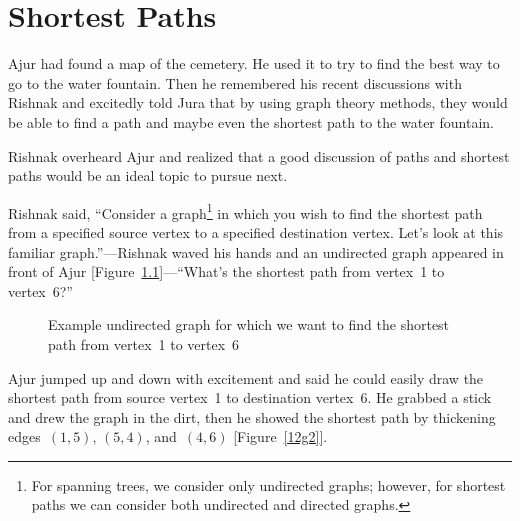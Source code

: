 \chapter{Shortest Paths}
Ajur had found a map of the cemetery. He used it to try to find the best way to go to the water fountain. Then he remembered his recent discussions with Rishnak and excitedly told Jura that by using graph theory methods, they would be able to find a path and maybe even the shortest path to the water fountain.

Rishnak overheard Ajur and realized that a good discussion of paths and shortest paths would be an ideal topic to pursue next.

Rishnak said, ``Consider a graph\footnote{For spanning trees, we consider only undirected graphs; however, for shortest paths we can consider both undirected and directed graphs.} in which you wish to find the shortest path from a specified source vertex to a specified destination vertex. Let's look at this familiar graph.''---Rishnak waved his hands and an undirected graph appeared in front of Ajur [Figure~\ref{12g1}]---``What's the shortest path from vertex~1 to vertex~6?''

\begin{figure}
\begin{center}
\caption{Example undirected graph for which we want to find the shortest path from vertex~1 to vertex~6}\label{12g1}
\end{center}
\end{figure}

Ajur jumped up and down with excitement and said he could easily draw the shortest path from source vertex~1 to destination vertex~6. He grabbed a stick and drew the graph in the dirt, then he showed the shortest path by thickening edges~$(1,5)$, $(5,4)$, and~$(4,6)$ [Figure~\ref{12g2}].

